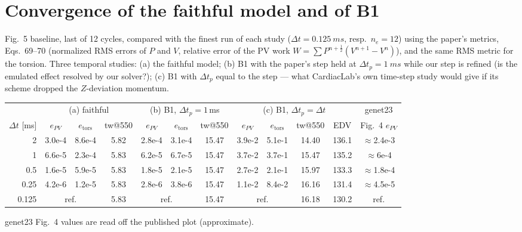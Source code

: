 \documentclass[10pt]{article}
\begin{document}
\section*{Convergence of the faithful model and of B1}
Fig.~5 baseline, last of 12 cycles, compared with the finest run of each study
($\Delta t=\SI{0.125}{ms}$, resp.\ $n_e=12$) using the paper's metrics, Eqs.~69--70 (normalized
RMS errors of $P$ and $V$, relative error of the PV work $W=\sum P^{n+\frac12}(V^{n+1}-V^n)$), and
the same RMS metric for the torsion. Three temporal studies: (a) the faithful model; (b) B1 with
the paper's step held at $\Delta t_p=\SI{1}{ms}$ while our step is refined (is the emulated
effect resolved by our solver?); (c) B1 with $\Delta t_p$ equal to the step --- what
CardiacLab's own time-step study would give if its scheme dropped the $Z$-deviation momentum.
\begin{center}\small\setlength{\tabcolsep}{4pt}\begin{tabular}{r|ccc|ccc|cccc|c}
\toprule
 & \multicolumn{3}{c|}{(a) faithful} & \multicolumn{3}{c|}{(b) B1, $\Delta t_p{=}1$\,ms} &
 \multicolumn{4}{c|}{(c) B1, $\Delta t_p{=}\Delta t$} & genet23 \\
$\Delta t$ [ms] & $e_{PV}$ & $e_\text{tors}$ & tw@550 & $e_{PV}$ & $e_\text{tors}$ & tw@550 &
 $e_{PV}$ & $e_\text{tors}$ & tw@550 & EDV & Fig.~4 $e_{PV}$ \\ \midrule
2    & 3.0e-4 & 8.6e-4 & 5.82 & 2.8e-4 & 3.1e-4 & 15.47 & 3.9e-2 & 5.1e-1 & 14.40 & 136.1 & $\approx$2.4e-3 \\
1    & 6.6e-5 & 2.3e-4 & 5.83 & 6.2e-5 & 6.7e-5 & 15.47 & 3.7e-2 & 3.7e-1 & 15.47 & 135.2 & $\approx$6e-4 \\
0.5  & 1.6e-5 & 5.9e-5 & 5.83 & 1.8e-5 & 2.1e-5 & 15.47 & 2.7e-2 & 2.1e-1 & 15.97 & 133.3 & $\approx$1.8e-4 \\
0.25 & 4.2e-6 & 1.2e-5 & 5.83 & 2.8e-6 & 3.8e-6 & 15.47 & 1.1e-2 & 8.4e-2 & 16.16 & 131.4 & $\approx$4.5e-5 \\
0.125 & \multicolumn{2}{c}{ref.} & 5.83 & \multicolumn{2}{c}{ref.} & 15.47 & \multicolumn{2}{c}{ref.} & 16.18 & 130.2 & ref. \\
\bottomrule
\end{tabular}\end{center}
{\footnotesize genet23 Fig.~4 values are read off the published plot (approximate).}
\end{document}
